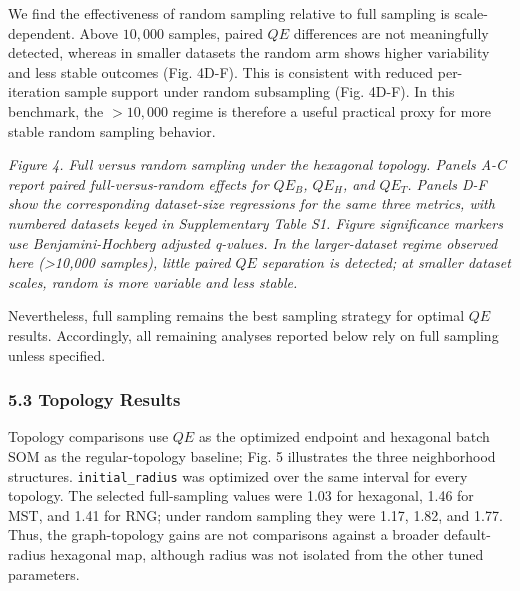 \documentclass[
]{article}
\makeatletter
\newcommand*\pandocbounded[1]{%
  \sbox\pandoc@box{#1}%
  \Gscale@div\@tempa{\textheight}{\dimexpr\ht\pandoc@box+\dp\pandoc@box\relax}%
  \Gscale@div\@tempb{\linewidth}{\wd\pandoc@box}%
  \ifdim\@tempb\p@<\@tempa\p@\let\@tempa\@tempb\fi%
  \ifdim\@tempa\p@<\p@\scalebox{\@tempa}{\usebox\pandoc@box}%
  \else\usebox{\pandoc@box}%
  \fi%
}
\providecommand{\DIFadd}[1]{{\protect\color{blue} #1}} %
\providecommand{\DIFaddbegin}{} %
\providecommand{\DIFaddend}{} %
\makeatother
\begin{document}
We find the effectiveness of random sampling relative to full sampling
is scale-dependent. Above \(10{,}000\) samples, paired \(QE\)
differences are not meaningfully detected, whereas in smaller datasets
the random arm shows higher variability and less stable outcomes (Fig.
4D-F). This is consistent with reduced per-iteration sample support
under random subsampling (Fig. 4D-F). In this benchmark, the
\(>10{,}000\) regime is therefore a useful practical proxy for more
stable random sampling behavior.

\pandocbounded{}
\emph{Figure 4. Full versus random sampling under the hexagonal
topology. Panels A-C report paired full-versus-random effects for
\(QE_B\), \(QE_H\), and \(QE_T\). Panels D-F show the corresponding
dataset-size regressions for the same three metrics, with numbered
datasets keyed in Supplementary Table S1. \DIFaddbegin \DIFadd{Figure significance markers
use Benjamini-Hochberg adjusted q-values. }\DIFaddend In the larger-dataset regime
observed here (\textgreater10,000 samples), little paired \(QE\)
separation is detected; at smaller dataset scales, random is more
variable and less stable.}

Nevertheless, full sampling remains the best sampling strategy for
optimal \(QE\) results. Accordingly, all remaining analyses reported
below rely on full sampling unless specified.

\subsubsection{5.3 Topology Results}\label{topology-results}

Topology comparisons  \DIFaddbegin \DIFadd{use }\DIFaddend \(QE\)  \DIFaddbegin \DIFadd{as the optimized endpoint and hexagonal
batch SOM as the }\DIFaddend regular-topology baseline; Fig. 5  \DIFaddbegin \DIFadd{illustrates the three
neighborhood structures. \texttt{initial\_radius} was optimized over the
same interval for every topology. The selected full-sampling values were
1.03 for hexagonal, 1.46 for }\DIFaddend MST, and  \DIFaddbegin \DIFadd{1.41 for RNG; under random
sampling they were 1.17, 1.82, and 1.77. Thus, the graph-topology gains
are not comparisons against a broader default-radius hexagonal map,
although radius was not isolated from the other tuned parameters.
}\DIFaddend
\end{document}
